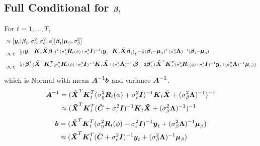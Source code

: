 \documentclass[fleqn]{article}
\def\bm#1{\mbox{\boldmath $#1$}}
\begin{document}
\subsection{Full Conditional for $\bm{\beta}_t$}
%
For $t = 1, \ldots, T$,
\begin{align*}
[\bm{\beta}_t | \cdot] & \propto [\bm{y}_t | \bm{\beta}_t, \sigma^2_\eta, \sigma^2_\epsilon, \phi] [\bm{\beta}_t | \bm{\mu}_\beta, \sigma^2_\beta]\\
%
& \propto e^{ - \frac{1} {2} (\bm{y}_t - \bm{K}_t \bm{\tilde{X}} \bm{\beta}_t)^T (\sigma^2_\eta \bm{R}_t(\phi) + \sigma^2_\epsilon \bm{I})^{ - 1} (\bm{y}_t - \bm{K}_t \bm{\tilde{X}} \bm{\beta}_t)} e^{ - \frac{1} {2} (\bm{\beta}_t - \bm{\mu}_\beta)^T (\sigma^2_{\beta} \bm{\Lambda})^{ - 1} (\bm{\beta}_t - \bm{\mu}_\beta)}\\
%
& \propto e^{ - \frac{1} {2} \{\bm{\beta}_t^T (\bm{\tilde{X}}^T \bm{K}_t^T (\sigma^2_\eta \bm{R}_t(\phi) + \sigma^2_\epsilon \bm{I})^{ - 1} \bm{K}_t \bm{\tilde{X}} + (\sigma^2_{\beta} \bm{\Lambda})^{ - 1}) \bm{\beta}_t - 2 \bm{\beta}_t^T (\bm{\tilde{X}}^T \bm{K}_t^T (\sigma^2_\eta \bm{R}_t(\phi) + \sigma^2_\epsilon \bm{I})^{ - 1} \bm{y}_t + (\sigma^2_{\beta} \bm{\Lambda})^{ - 1} \bm{\mu}_\beta) \} }
\end{align*}
%
which is Normal with mean $ \bm{A}^{ - 1} \bm{b}$ and variance $\bm{A}^{ - 1}$.
\begin{align*}
  \bm{A}^{ - 1} & = (\bm{\tilde{X}}^T \bm{K}_t^T (\sigma^2_\eta \bm{R}_t(\phi) + \sigma^2_\epsilon \bm{I})^{ - 1} \bm{K}_t \bm{\tilde{X}} + (\sigma^2_{\beta} \bm{\Lambda})^{ - 1})^{ - 1}\\
  & \approx (\bm{\tilde{X}}^T \bm{K}_t^T (\tilde{\bm{C}} + \sigma^2_\epsilon \bm{I})^{ - 1} \bm{K}_t \bm{\tilde{X}} + (\sigma^2_{\beta} \bm{\Lambda})^{ - 1})^{ - 1}
\end{align*}
\begin{align*}
  \bm{b} & = (\bm{\tilde{X}}^T \bm{K}_t^T (\sigma^2_\eta \bm{R}_t(\phi) + \sigma^2_\epsilon \bm{I})^{ - 1} \bm{y}_t + (\sigma^2_{\beta} \bm{\Lambda})^{ - 1} \bm{\mu}_\beta)\\
  & \approx (\bm{\tilde{X}}^T \bm{K}_t^T (\tilde{\bm{C}} + \sigma^2_\epsilon \bm{I})^{ - 1} \bm{y}_t + (\sigma^2_{\beta} \bm{\Lambda})^{ - 1} \bm{\mu}_\beta)
\end{align*}
%
\end{document}
